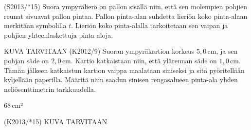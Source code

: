\begin{tehtava} 
(S2013/*15) Suora ympyrälierö on pallon sisällä niin, että sen molempien pohjien reunat sivuavat pallon pintaa. Pallon pinta-alan suhdetta lieriön koko pinta-alaan merkitään symbolilla $t$. Lieriön koko pinta-alalla tarkoitetaan sen vaipan ja pohjien yhteenlaskettuja pinta-aloja.
  \begin{alakohdat}
  \end{alakohdat}
				\begin{vastaus}
				\begin{alakohdat}
				\end{alakohdat}
				\end{vastaus}
\end{tehtava}

\begin{tehtava} 
KUVA TARVITAAN
(K2012/9) Suoran ympyräkartion korkeus $5,0$\,cm, ja sen pohjan säde on $2,0$\,cm. Kartio katkaistaan niin, että yläreunan säde on $1,0$\,cm. Tämän jälkeen katkaistun kartion vaippa maalataan siniseksi ja sitä pyöritellään kyljellään paperilla. Määritä näin saadun sinisen rengasalueen pinta-ala yhden neliösenttimetrin tarkkuudella.
  \begin{vastaus}
  $68$\,cm²
  \end{vastaus}
\end{tehtava}

\begin{tehtava} 
(K2013/*15) KUVA TARVITAAN
  \begin{alakohdat}
  \end{alakohdat}
				\begin{vastaus}
				\begin{alakohdat}
				 \alakohta{$d=2\sqrt{r_1r_2}$}
				 \alakohta{$r_3=\dfrac{r_1r_2}{(\sqrt{r_1}+\sqrt{r_2})^2}$}
				\end{alakohdat}
				\end{vastaus}
\end{tehtava}


